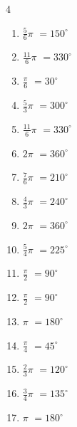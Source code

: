 \begin{multicols}{4}
\begin{enumerate}
  \item $\displaystyle \frac{5}{6}\pi$
        $\displaystyle =150^{\circ}$

  \item $\displaystyle \frac{11}{6}\pi$
        $\displaystyle =330^{\circ}$

  \item $\displaystyle \frac{\pi}{6}$
        $\displaystyle =30^{\circ}$

  \item $\displaystyle \frac{5}{3}\pi$
        $\displaystyle =300^{\circ}$

  \item $\displaystyle \frac{11}{6}\pi$
        $\displaystyle =330^{\circ}$

  \item $\displaystyle 2\pi$
        $\displaystyle =360^{\circ}$

  \item $\displaystyle \frac{7}{6}\pi$
        $\displaystyle =210^{\circ}$

  \item $\displaystyle \frac{4}{3}\pi$
        $\displaystyle =240^{\circ}$

  \item $\displaystyle 2\pi$
        $\displaystyle =360^{\circ}$

  \item $\displaystyle \frac{5}{4}\pi$
        $\displaystyle =225^{\circ}$

  \item $\displaystyle \frac{\pi}{2}$
        $\displaystyle =90^{\circ}$

  \item $\displaystyle \frac{\pi}{2}$
        $\displaystyle =90^{\circ}$

  \item $\displaystyle \pi$
        $\displaystyle =180^{\circ}$

  \item $\displaystyle \frac{\pi}{4}$
        $\displaystyle =45^{\circ}$

  \item $\displaystyle \frac{2}{3}\pi$
        $\displaystyle =120^{\circ}$

  \item $\displaystyle \frac{3}{4}\pi$
        $\displaystyle =135^{\circ}$

  \item $\displaystyle \pi$
        $\displaystyle =180^{\circ}$


\end{enumerate}
\end{multicols}
